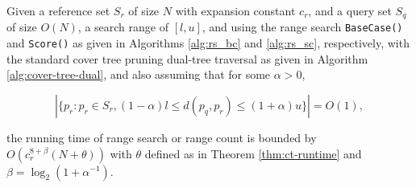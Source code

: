 \begin{thm}
Given a reference set $S_r$ of size $N$ with expansion constant $c_r$, and a
query set $S_q$ of size $O(N)$, a search range of $[l, u]$, and using the range
search \texttt{BaseCase()} and \texttt{Score()} as given in Algorithms
\ref{alg:rs_bc} and \ref{alg:rs_sc}, respectively, with the standard cover tree
pruning dual-tree traversal as given in Algorithm \ref{alg:cover-tree-dual}, and
also assuming that for some $\alpha > 0$,

\begin{equation}
\left| \{ p_r: p_r \in S_r, (1 - \alpha) l \le d(p_q, p_r) \le (1 + \alpha) u \}
\right| = O(1),
\end{equation}

\noindent the running time of range search or range count is bounded by
$O(c_r^{8 + \beta} (N + \theta))$ with $\theta$ defined as in Theorem
\ref{thm:ct-runtime} and
$\beta = \log_2 (1 + \alpha^{-1})$.
\label{thm:rs}
\end{thm}

